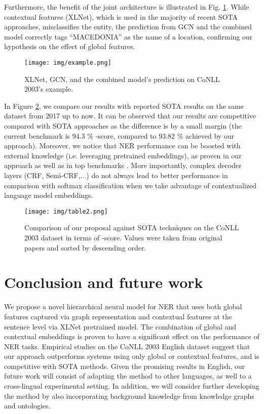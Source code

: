 \documentclass[runningheads]{llncs}
\begin{document}
Furthermore, the benefit of the joint architecture is illustrated in Fig. \ref{fig:comp}. While contextual features (XLNet), which is used in the majority of recent SOTA approaches, misclassifies the entity, the prediction from GCN and the combined model correctly tags ``MACEDONIA'' as the name of a location, confirming our hypothesis on the effect of global features.



\begin{figure}[ht]
  \centering
  \texttt{[image: img/example.png]}
  \vspace{-0.3cm}
  \caption{XLNet, GCN, and the combined model's prediction on CoNLL 2003's example.}
  \label{fig:comp}
\end{figure}




In Figure \ref{fig:method-comparison}, we compare our results with reported SOTA results on the same dataset from 2017 up to now. It can be observed that our results are competitive compared with SOTA approaches as the difference is by a small margin (the current benchmark is 94.3 \% -score, compared to 93.82 \%  achieved by our approach). Moreover, we notice that NER performance can be boosted with external knowledge (i.e. leveraging pretrained embeddings), as proven in our approach as well as in top benchmarks \cite{liu2019towards,liu2019gcdt,luo2020hierarchical}. More importantly, complex decoder layers (CRF, Semi-CRF,...) do not always lead to better performance in comparison with softmax classification when we take advantage of contextualized language model embeddings.

\begin{figure}[ht]
  \centering
  \texttt{[image: img/table2.png]}
    \vspace{-0.3cm}
  \caption{Comparison of our proposal against SOTA techniques on the CoNLL 2003 dataset in terms of -score. Values were taken from original papers and sorted by descending order.}
  \label{fig:method-comparison}
\end{figure}




\vspace{-0.3cm}
\section{Conclusion and future work}
\label{sec:conclusion}
We propose a novel hierarchical neural model for NER that uses both global features captured via graph representation and contextual features at the sentence level via XLNet pretrained model. The combination of global and contextual embeddings is proven to have a significant effect on the performance of NER tasks. Empirical studies on the CoNLL 2003 English dataset suggest that our approach outperforms systems using only global or contextual features, and is competitive with SOTA methods. Given the promising results in English, our future work will consist of adapting the method to other languages, as well to a cross-lingual experimental setting. In addition, we will consider further developing the method by also incorporating background knowledge from knowledge graphs and ontologies.
\end{document}
